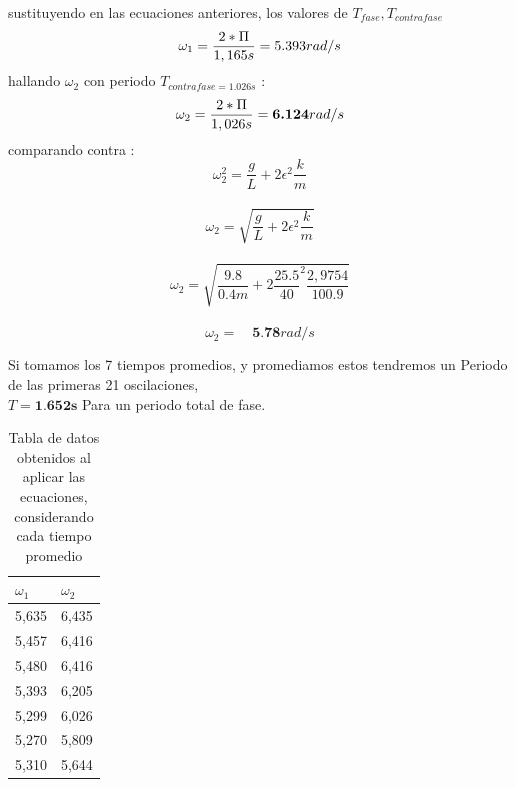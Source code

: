 \documentclass{article}
\begin{document}
sustituyendo en las ecuaciones anteriores, los valores de ${ T }_{ fase }  , { T }_{ contrafase } $
$${ \omega  }_{ 1 }=\frac { 2*\Pi  }{1,165s} =5.393rad/s\\$$
hallando ${ \omega  }_{ 2 }$ con periodo ${ T }_{ contrafase=1.026s}$ :
$${ \omega  }_{ 2 }=\frac { 2*\Pi  }{1,026s} =\textbf{6.124}rad/s\\$$
comparando contra :
$${ \omega  }_{ 2 }^{ 2 }=\frac { g }{ L } +2{ \epsilon  }^{ 2 }\frac { k }{ m } $$\\
$${ \omega  }_{ 2 }=\sqrt { \frac { g }{ L } +2{ \epsilon  }^{ 2 }\frac { k }{ m }  } $$\\
$${ \omega  }_{ 2 }=\sqrt { \frac { 9.8 }{ 0.4m } +2{ \frac { 25.5 }{ 40 }  }^{ 2 }\frac { 2,9754 }{ 100.9 }  }$$\\
$${ \omega  }_{ 2 }=\quad \textbf{5.78}rad/s$$

Si tomamos los 7 tiempos promedios, y  promediamos estos tendremos un Periodo de las primeras 21 oscilaciones, \\
$T=\textbf{1.652s}$ Para un periodo total de fase.
\newline
\begin{table}[H]
\centering
\begin{tabular}{|l|l|}
\hline
${ \omega  }_{ 1 }$ & ${ \omega  }_{ 2 }$ \\ \hline
5,635  & 6,435     \\ \hline
5,457   & 6,416  \\ \hline
5,480   & 6,416  \\ \hline
5,393   & 6,205  \\ \hline
5,299   & 6,026  \\ \hline
5,270   & 5,809  \\ \hline
5,310   & 5,644  \\ \hline
\end{tabular}
\caption{Tabla de datos obtenidos al aplicar las ecuaciones, considerando cada tiempo promedio}
\label{general}
\end{table}
\end{document}
